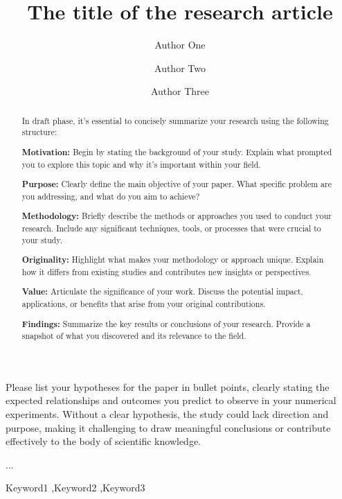 \documentclass[preprint,review,10pt]{elsarticle}
\begin{document}

\begin{frontmatter}

\title{The title of the research article}
    
    \author[1]{Author One}
    \author[1]{Author Two}
    \author[2]{Author Three\texorpdfstring{}{}}
    

    
        

\begin{highlights}
\item Please list your hypotheses for the paper in bullet points, clearly stating the expected relationships and outcomes you predict to observe in your numerical experiments. Without a clear hypothesis, the study could lack direction and purpose, making it challenging to draw meaningful conclusions or contribute effectively to the body of scientific knowledge.
\item ... 

\end{highlights}

\begin{abstract}
In draft phase, it’s essential to concisely summarize your research using the following structure:

\textbf{Motivation:} Begin by stating the background of your study. Explain what prompted you to explore this topic and why it’s important within your field.

\textbf{Purpose:} Clearly define the main objective of your paper. What specific problem are you addressing, and what do you aim to achieve?

\textbf{Methodology:} Briefly describe the methods or approaches you used to conduct your research. Include any significant techniques, tools, or processes that were crucial to your study.

\textbf{Originality:} Highlight what makes your methodology or approach unique. Explain how it differs from existing studies and contributes new insights or perspectives.

\textbf{Value:} Articulate the significance of your work. Discuss the potential impact, applications, or benefits that arise from your original contributions.

\textbf{Findings:} Summarize the key results or conclusions of your research. Provide a snapshot of what you discovered and its relevance to the field.


\end{abstract}



\begin{keyword}
Keyword1 \sep Keyword2 \sep Keyword3
\end{keyword}

\end{frontmatter}
\end{document}

